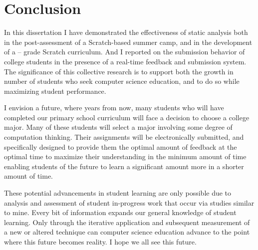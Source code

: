 \chapter{Conclusion} \label{chap:conclusion}

In this dissertation I have demonstrated the effectiveness of static analysis
both in the post-assessment of a Scratch-based summer camp, and in the
development of a  --  grade Scratch curriculum. And I reported on
the submission behavior of college students in the presence of a real-time
feedback and submission system. The significance of this collective research is
to support both the growth in number of students who seek computer science
education, and to do so while maximizing student performance.

I envision a future, where years from now, many students who will have
completed our primary school curriculum will face a decision to choose a
college major. Many of these students will select a major involving some degree
of computation thinking. Their assignments will be electronically submitted,
and specifically designed to provide them the optimal amount of feedback at the
optimal time to maximize their understanding in the minimum amount of time
enabling students of the future to learn a significant amount more in a shorter
amount of time.

These potential advancements in student learning are only possible due to
analysis and assessment of student in-progress work that occur via studies
similar to mine. Every bit of information expands our general knowledge of
student learning. Only through the iterative application and subsequent
measurement of a new or altered technique can computer science education
advance to the point where this future becomes reality. I hope we all see this
future.
